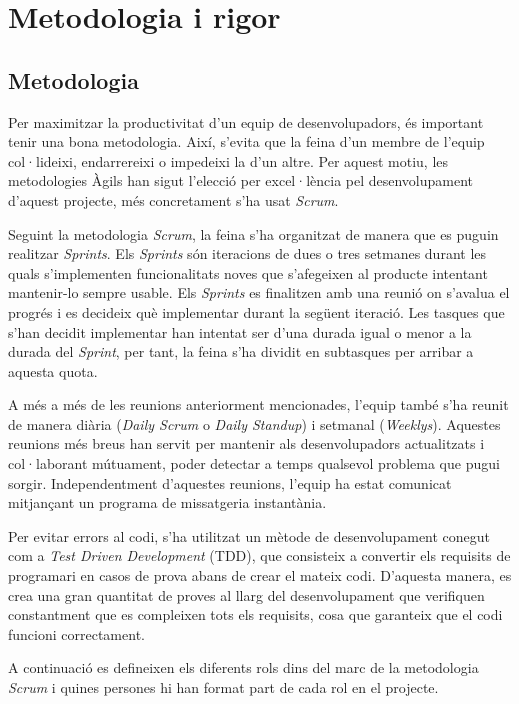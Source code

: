 \section{Metodologia i rigor}

\subsection{Metodologia}
Per maximitzar la productivitat d'un equip de desenvolupadors, és important tenir una bona metodologia. Així, s'evita que la feina d'un membre de l'equip col·lideixi, endarrereixi o impedeixi la d'un altre. Per aquest motiu, les metodologies Àgils han sigut l'elecció per excel·lència pel desenvolupament d'aquest projecte, més concretament s'ha usat \textit{Scrum}.

Seguint la metodologia \textit{Scrum}, la feina s'ha organitzat de manera que es puguin realitzar \textit{Sprints}. Els \textit{Sprints} són iteracions de dues o tres setmanes durant les quals s'implementen funcionalitats noves que s'afegeixen al producte intentant mantenir-lo sempre usable. Els \textit{Sprints} es finalitzen amb una reunió on s'avalua el progrés i es decideix què implementar durant la següent iteració. Les tasques que s'han decidit implementar han intentat ser d'una durada igual o menor a la durada del \textit{Sprint}, per tant, la feina s'ha dividit en subtasques per arribar a aquesta quota.

A més a més de les reunions anteriorment mencionades, l'equip també s'ha reunit de manera diària (\textit{Daily Scrum} o \textit{Daily Standup}) i setmanal (\textit{Weeklys}). Aquestes reunions més breus han servit per mantenir als desenvolupadors actualitzats i col·laborant mútuament, poder detectar a temps qualsevol problema que pugui sorgir. Independentment d'aquestes reunions, l'equip ha estat comunicat mitjançant un programa de missatgeria instantània.

Per evitar errors al codi, s'ha utilitzat un mètode de desenvolupament conegut com a \textit{Test Driven Development} (TDD), que consisteix a convertir els requisits de programari en casos de prova abans de crear el mateix codi. D'aquesta manera, es crea una gran quantitat de proves al llarg del desenvolupament que verifiquen constantment que es compleixen tots els requisits, cosa que garanteix que el codi funcioni correctament.

A continuació es defineixen els diferents rols dins del marc de la metodologia \textit{Scrum} \cite{scrum} i quines persones hi han format part de cada rol en el projecte.

